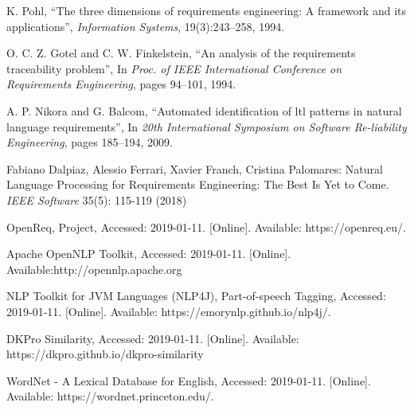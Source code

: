 \documentclass[a4paper]{article}
\begin{document}
\begin{thebibliography}{99}

K. Pohl, “The three dimensions of requirements engineering: A framework
and its applications”,  \textit{Information Systems}, 19(3):243--258, 1994.

O. C. Z. Gotel and C. W. Finkelstein, “An analysis of the requirements traceability problem”, In \textit{Proc. of IEEE International Conference on Requirements Engineering}, pages 94--101, 1994.

A. P. Nikora and G. Balcom, “Automated identification of ltl patterns in natural language requirements”, In \textit{20th International Symposium on Software Re-liability Engineering}, pages 185--194, 2009.

Fabiano Dalpiaz, Alessio Ferrari, Xavier
Franch, Cristina Palomares: Natural Language Processing for Requirements
Engineering: The Best Is Yet to Come. \textit{IEEE Software} 35(5): 115-119 (2018)

OpenReq, Project, Accessed: 2019-01-11. [Online]. Available: https://openreq.eu/.

Apache OpenNLP Toolkit, Accessed: 2019-01-11. [Online]. Available:http://opennlp.apache.org


NLP Toolkit for JVM Languages (NLP4J), Part-of-speech Tagging, Accessed: 2019-01-11. [Online]. Available: https://emorynlp.github.io/nlp4j/.

DKPro Similarity, Accessed: 2019-01-11. [Online]. Available: https://dkpro.github.io/dkpro-similarity

WordNet - A Lexical Database for English, Accessed: 2019-01-11. [Online]. Available: https://wordnet.princeton.edu/.

\end{thebibliography}
\end{document}
